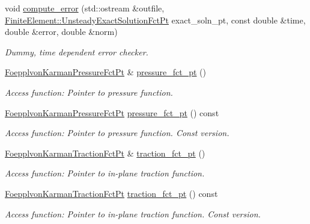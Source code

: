\begin{DoxyCompactItemize}
void \hyperlink{classoomph_1_1DisplacementBasedFoepplvonKarmanEquations_aab27e73211bd9c4a569730883dc869b3}{compute\+\_\+error} (std\+::ostream \&outfile, \hyperlink{classoomph_1_1FiniteElement_ad4ecf2b61b158a4b4d351a60d23c633e}{Finite\+Element\+::\+Unsteady\+Exact\+Solution\+Fct\+Pt} exact\+\_\+soln\+\_\+pt, const double \&time, double \&error, double \&norm)
\begin{DoxyCompactList}\small\item\em Dummy, time dependent error checker. \end{DoxyCompactList}\item 
\hyperlink{classoomph_1_1DisplacementBasedFoepplvonKarmanEquations_a9d63b92b57e3b521a5a10cecdafc4e65}{Foepplvon\+Karman\+Pressure\+Fct\+Pt} \& \hyperlink{classoomph_1_1DisplacementBasedFoepplvonKarmanEquations_a4a3f67d05cac2f289195c025a4c28d67}{pressure\+\_\+fct\+\_\+pt} ()
\begin{DoxyCompactList}\small\item\em Access function\+: Pointer to pressure function. \end{DoxyCompactList}\item 
\hyperlink{classoomph_1_1DisplacementBasedFoepplvonKarmanEquations_a9d63b92b57e3b521a5a10cecdafc4e65}{Foepplvon\+Karman\+Pressure\+Fct\+Pt} \hyperlink{classoomph_1_1DisplacementBasedFoepplvonKarmanEquations_a83ab5c54053dc8c57395054158ca6c45}{pressure\+\_\+fct\+\_\+pt} () const
\begin{DoxyCompactList}\small\item\em Access function\+: Pointer to pressure function. Const version. \end{DoxyCompactList}\item 
\hyperlink{classoomph_1_1DisplacementBasedFoepplvonKarmanEquations_ab2c41b3ecc15b89802657c068ee3e1cc}{Foepplvon\+Karman\+Traction\+Fct\+Pt} \& \hyperlink{classoomph_1_1DisplacementBasedFoepplvonKarmanEquations_adae0b6cc04c60bf4dcabdaea5edc3c54}{traction\+\_\+fct\+\_\+pt} ()
\begin{DoxyCompactList}\small\item\em Access function\+: Pointer to in-\/plane traction function. \end{DoxyCompactList}\item 
\hyperlink{classoomph_1_1DisplacementBasedFoepplvonKarmanEquations_ab2c41b3ecc15b89802657c068ee3e1cc}{Foepplvon\+Karman\+Traction\+Fct\+Pt} \hyperlink{classoomph_1_1DisplacementBasedFoepplvonKarmanEquations_a51df88cf83e1358f852974f2f358c42c}{traction\+\_\+fct\+\_\+pt} () const
\begin{DoxyCompactList}\small\item\em Access function\+: Pointer to in-\/plane traction function. Const version. \end{DoxyCompactList}\item 

\end{DoxyCompactItemize}
